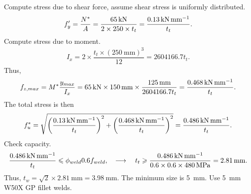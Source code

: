 \begin{solution}
Compute stress due to shear force, assume shear stress is uniformly distributed.
\begin{gather*}
f'_y=\dfrac{N^*}{A}=\dfrac{\SI{65}{\kilo\newton}}{2\times250\times{}t_t}=\dfrac{\SI{0.13}{\kilo\newton\per\milli\meter}}{t_t}.
\end{gather*}
Compute stress due to moment.
\begin{gather*}
I_x=2\times\dfrac{t_t\times\left(\SI{250}{\mm}\right)^3}{12}=2604166.7t_t.
\end{gather*}
Thus,
\begin{gather*}
f_{z,max}=M^*\dfrac{y_{max}}{I_x}=\SI{65}{\kilo\newton}\times\SI{150}{\milli\meter}\times\dfrac{\SI{125}{\milli\meter}}{2604166.7t_t}=\dfrac{\SI{0.468}{\kilo\newton\per\milli\meter}}{t_t}.
\end{gather*}
The total stress is then
\begin{gather*}
f_u^*=\sqrt{\left(\dfrac{\SI{0.13}{\kilo\newton\per\milli\meter}}{t_t}\right)^2+\left(\dfrac{\SI{0.468}{\kilo\newton\per\milli\meter}}{t_t}\right)^2}=\dfrac{\SI{0.486}{\kilo\newton\per\milli\meter}}{t_t}.
\end{gather*}
Check capacity.
\begin{gather*}
\dfrac{\SI{0.486}{\kilo\newton\per\milli\meter}}{t_t}\leqslant\phi_{weld}0.6f_{weld},\quad\longrightarrow\quad
t_t\geqslant\dfrac{\SI{0.486}{\kilo\newton\per\milli\meter}}{0.6\times0.6\times\SI{480}{\mega\pascal}}=\SI{2.81}{\milli\meter}.
\end{gather*}
Thus, $t_w=\sqrt{2}\times\SI{2.81}{\mm}=\SI{3.98}{\mm}$. The minimum size is \SI{5}{\mm}. Use \SI{5}{\mm} W50X GP fillet welds.
\end{solution}